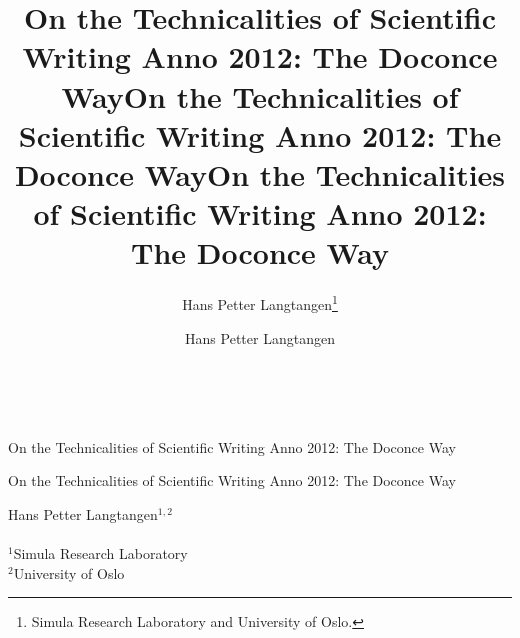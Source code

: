 \documentclass[%
oneside,                 %
final,                   %
10pt]{article}
\begin{document}







\title{On the Technicalities of Scientific Writing Anno 2012: The Doconce Way}


\thispagestyle{empty}
\hbox{\ \ }
\vfill
\begin{center}
{\huge{\bfseries{
\begin{spacing}{1.25}
On the Technicalities of Scientific Writing Anno 2012: The Doconce Way
\end{spacing}
}}}

\title*{On the Technicalities of Scientific Writing Anno 2012: The Doconce Way}

\title{On the Technicalities of Scientific Writing Anno 2012: The Doconce Way}
\begin{center}
{\LARGE\bf
\begin{spacing}{1.25}
On the Technicalities of Scientific Writing Anno 2012: The Doconce Way
\end{spacing}
}
\end{center}

\author{Hans Petter Langtangen\footnote{Simula Research Laboratory and University of Oslo.}}

\vspace{1.3cm}

    {\Large\textsf{Hans Petter Langtangen${}^{1, 2}$}}\\ [3mm]
    
\ \\ [2mm]

{\large\textsf{${}^1$Simula Research Laboratory} \\ [1.5mm]}
{\large\textsf{${}^2$University of Oslo} \\ [1.5mm]}

\author{Hans Petter Langtangen}


\end{center}
\end{document}
